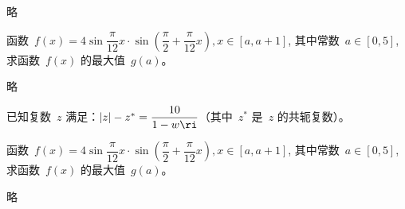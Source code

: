 \documentclass[printbox]{BHCexam}
\begin{document}
\begin{questions}
\begin{solution}
略
\end{solution}

\newpage

\question[16] 函数~$f(x)=4\sin\dfrac{\pi}{12}x\cdot\sin
    \left(\dfrac{\pi}{2}+\dfrac{\pi}{12}x\right),x\in[a,a+1]$,
    其中常数~$a\in[0,5]$, 求函数~$f(x)$ 的最大值~$g(a)$。

\begin{solution}
略
\end{solution}

\newpage
\question 已知复数~$z$ 满足：$\abs{z}-z^*=\dfrac{10}{1-w\ri}$（其中~$z^*$
是~$z$ 的共轭复数）。

\begin{solution}
\end{solution}

\newpage

\question[18] 函数~$f(x)=4\sin\dfrac{\pi}{12}x\cdot\sin
    \left(\dfrac{\pi}{2}+\dfrac{\pi}{12}x\right),x\in[a,a+1]$,
    其中常数~$a\in[0,5]$, 求函数~$f(x)$ 的最大值~$g(a)$。

\begin{solution}
略
\end{solution}

\end{questions}
\end{document}
